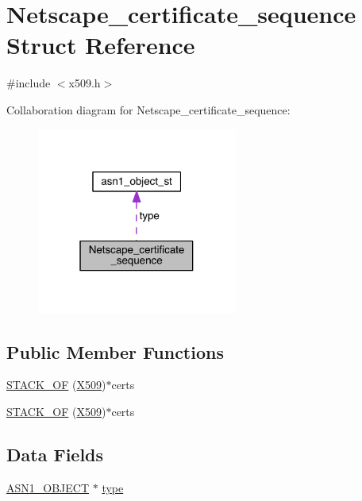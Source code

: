 \hypertarget{struct_netscape__certificate__sequence}{}\section{Netscape\+\_\+certificate\+\_\+sequence Struct Reference}
\label{struct_netscape__certificate__sequence}


{\ttfamily \#include $<$x509.\+h$>$}



Collaboration diagram for Netscape\+\_\+certificate\+\_\+sequence\+:\nopagebreak
\begin{figure}[H]
\begin{center}
\leavevmode
\includegraphics[width=187pt]{struct_netscape__certificate__sequence__coll__graph}
\end{center}
\end{figure}
\subsection*{Public Member Functions}
\begin{DoxyCompactItemize}
\item 
\hyperlink{struct_netscape__certificate__sequence_a51f0ddafb33cce3c0ce72817d32f1baa}{S\+T\+A\+C\+K\+\_\+\+OF} (\hyperlink{crypto_2ossl__typ_8h_a4f666bde6518f95deb3050c54b408416}{X509})$\ast$certs
\item 
\hyperlink{struct_netscape__certificate__sequence_a51f0ddafb33cce3c0ce72817d32f1baa}{S\+T\+A\+C\+K\+\_\+\+OF} (\hyperlink{crypto_2ossl__typ_8h_a4f666bde6518f95deb3050c54b408416}{X509})$\ast$certs
\end{DoxyCompactItemize}
\subsection*{Data Fields}
\begin{DoxyCompactItemize}
\item 
\hyperlink{crypto_2ossl__typ_8h_ae3fda0801e4c8e250087052bafb3ce2e}{A\+S\+N1\+\_\+\+O\+B\+J\+E\+CT} $\ast$ \hyperlink{struct_netscape__certificate__sequence_a208650820ad37e29d3433d9f20665c28}{type}
\end{DoxyCompactItemize}


